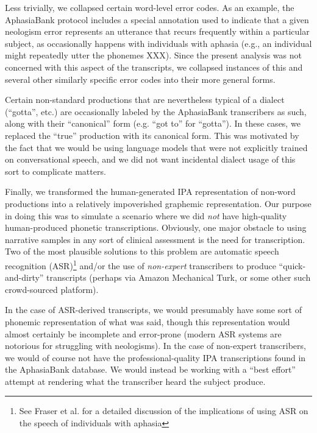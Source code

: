 Less trivially, we collapsed certain word-level error codes.
As an example, the AphasiaBank protocol includes a special annotation used to indicate that a given neologism error represents an utterance that recurs frequently within a particular subject, as occasionally happens with individuals with aphasia (e.g., an individual might repeatedly utter the phonemes XXX). %
Since the present analysis was not concerned with this aspect of the transcripts, we collapsed instances of this and several other similarly specific error codes into their more general forms.

Certain non-standard productions that are nevertheless typical of a dialect (``gotta'', etc.) are occasionally labeled by the AphasiaBank transcribers as such, along with their ``canonical'' form (e.g. ``got to'' for ``gotta''). In these cases, we replaced the ``true'' production with its canonical form. This was motivated by the fact that we would be using  language models that were not explicitly trained on conversational speech, and we did not want incidental dialect usage of this sort to complicate matters.

Finally, we transformed the human-generated IPA representation of non-word productions into a relatively impoverished graphemic representation.
Our purpose in doing this was to simulate a scenario where we did \emph{not} have high-quality human-produced phonetic transcriptions. Obviously, one major obstacle to using narrative samples in any sort of clinical assessment is the need for transcription.
Two of the most plausible solutions to this problem are automatic speech recognition (ASR)\footnote{See Fraser et al.  for a detailed discussion of the implications of using ASR on the speech of individuals with aphasia} and/or the use of \emph{non-expert} transcribers to produce ``quick-and-dirty'' transcripts (perhaps via Amazon Mechanical Turk, or some other such crowd-sourced platform).

In the case of ASR-derived transcripts, we would presumably have some sort of phonemic representation of what was said, though this representation would almost certainly be incomplete and error-prone (modern ASR systems are notorious for struggling with neologisms).
In the case of non-expert transcribers, we would of course not have the professional-quality IPA transcriptions found in the AphasiaBank database.
We would instead be working with a ``best effort'' attempt at rendering what the transcriber heard the subject produce.

